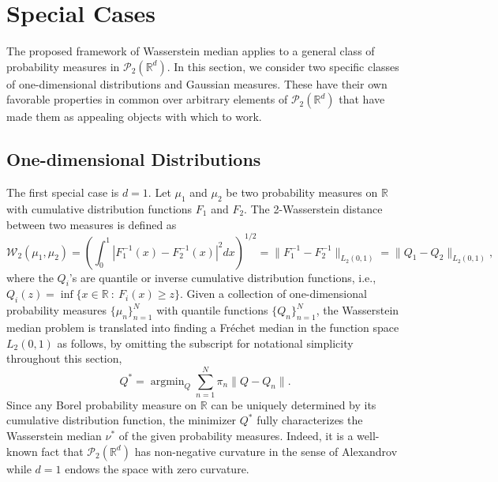 \documentclass[11pt]{article}
\DeclareMathOperator*{\argmin}{argmin}
\newcommand{\calP}{\mathcal{P}}
\newcommand{\calW}{\mathcal{W}}
\newcommand{\bbR}{\mathbb{R}}
\newcommand{\Frechet}{Fr\'{e}chet }
\begin{document}
\section{Special Cases}\label{sec:special}

The proposed framework of Wasserstein median applies to a general class of probability measures in $\calP_2(\mathbb{R}^d)$. In this section, we consider two specific classes of one-dimensional distributions and  Gaussian measures. These have their own favorable properties in common over arbitrary elements of $\calP_2(\bbR^d)$ that have made them as appealing objects with which to work.


\subsection{One-dimensional Distributions}

The first special case is $d=1$. Let $\mu_1$ and $\mu_2$ be two probability measures on $\bbR$ with cumulative distribution functions $F_1$ and $F_2$. The 2-Wasserstein distance between two measures is defined as
\begin{equation*}
	\calW_2 (\mu_1, \mu_2) = \left( \int_{0}^1 |F_1^{-1}(x) - F_2^{-1}(x)|^2 dx \right)^{1/2} = \|F_1^{-1} - F_2^{-1}\|_{L_2(0,1)} = \|Q_1 - Q_2 \|_{L_2(0,1)},
\end{equation*}
where the $Q_i$'s are quantile or inverse cumulative distribution functions, i.e., $Q_i (z) = \inf \lbrace x \in \bbR~:~ F_i(x) \geq z\rbrace$. Given a collection of one-dimensional probability measures $\lbrace \mu_n \rbrace_{n=1}^N$ with quantile functions $\lbrace Q_n\rbrace_{n=1}^N$, the Wasserstein median problem is translated into finding a \Frechet median in the function space  $L_2 (0,1)$ as follows, by omitting the subscript for notational simplicity throughout this section,
\begin{equation*}
	Q^* = \argmin_{Q} \sum_{n=1}^N \pi_n \|Q - Q_n \|.
\end{equation*}
Since any Borel probability measure on $\bbR$ can be uniquely determined by its cumulative distribution function, the minimizer $Q^*$ fully characterizes the Wasserstein median $\nu^*$ of the given probability measures. Indeed, it is a well-known fact that $\calP_2 (\bbR^d)$ has non-negative curvature in the sense of Alexandrov while $d=1$ endows the space with zero curvature. 
\end{document}

